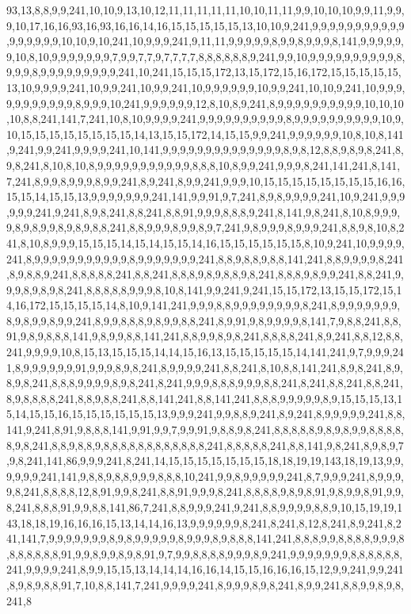 93,13,8,8,9,9,241,10,10,9,13,10,12,11,11,11,11,11,10,10,11,11,9,9,10,10,10,9,9,11,9,9,9,10,17,16,16,93,16,93,16,16,14,16,15,15,15,15,15,13,10,10,9,241,9,9,9,9,9,9,9,9,9,9,9,9,9,9,9,9,9,10,10,9,10,241,10,9,9,9,241,9,11,11,9,9,9,9,9,8,9,9,8,9,9,9,8,141,9,9,9,9,9,9,10,8,10,9,9,9,9,9,9,9,7,9,9,7,7,9,7,7,7,7,8,8,8,8,8,8,9,241,9,9,10,9,9,9,9,9,9,9,9,9,9,8,9,9,9,8,9,9,9,9,9,9,9,9,9,241,10,241,15,15,15,172,13,15,172,15,16,172,15,15,15,15,15,13,10,9,9,9,9,241,10,9,9,241,10,9,9,241,10,9,9,9,9,9,9,10,9,9,241,10,10,9,241,10,9,9,9,9,9,9,9,9,9,9,9,8,9,9,9,10,241,9,9,9,9,9,9,12,8,10,8,9,241,8,9,9,9,9,9,9,9,9,9,9,10,10,10,10,8,8,241,141,7,241,10,8,10,9,9,9,9,241,9,9,9,9,9,9,9,9,9,9,8,9,9,9,9,9,9,9,9,9,9,10,9,10,15,15,15,15,15,15,15,15,14,13,15,15,172,14,15,15,9,9,241,9,9,9,9,9,9,10,8,10,8,141,9,241,9,9,241,9,9,9,9,241,10,141,9,9,9,9,9,9,9,9,9,9,9,9,9,9,8,9,8,12,8,8,9,8,9,8,241,8,9,8,241,8,10,8,10,8,9,9,9,9,9,9,9,9,9,9,9,8,8,8,10,8,9,9,241,9,9,9,8,241,141,241,8,141,7,241,8,9,9,8,9,9,9,8,9,9,241,8,9,241,8,9,9,241,9,9,9,10,15,15,15,15,15,15,15,15,16,16,15,15,14,15,15,13,9,9,9,9,9,9,9,241,141,9,9,91,9,7,241,8,9,8,9,9,9,9,241,10,9,241,9,9,9,9,9,9,241,9,241,8,9,8,241,8,8,241,8,8,91,9,9,9,8,8,8,9,241,8,141,9,8,241,8,10,8,9,9,9,9,8,9,8,9,9,8,9,8,9,8,8,241,8,8,9,9,9,8,9,9,8,9,7,241,9,8,9,9,9,8,9,9,9,241,8,8,9,8,10,8,241,8,10,8,9,9,9,15,15,15,14,15,14,15,15,14,16,15,15,15,15,15,15,8,10,9,241,10,9,9,9,9,241,8,9,9,9,9,9,9,9,9,9,9,9,8,9,9,9,9,9,9,9,241,8,8,9,8,8,9,8,8,141,241,8,8,9,9,9,9,8,241,8,9,8,8,9,241,8,8,8,8,8,241,8,8,241,8,8,8,9,8,9,8,8,9,8,241,8,8,8,9,8,9,9,241,8,8,241,9,9,9,8,9,8,9,8,241,8,8,8,8,8,9,9,9,8,10,8,141,9,9,241,9,241,15,15,172,13,15,15,172,15,14,16,172,15,15,15,15,14,8,10,9,141,241,9,9,9,8,8,9,9,9,9,9,9,9,9,8,241,8,9,9,9,9,9,9,9,8,9,8,9,9,8,9,9,241,8,9,9,8,8,8,9,8,9,9,8,8,241,8,9,91,9,8,9,9,9,9,8,141,7,9,8,8,241,8,8,91,9,8,9,8,8,8,141,9,8,9,9,8,8,141,241,8,8,9,9,8,9,8,241,8,8,8,8,241,8,9,241,8,8,12,8,8,241,9,9,9,9,10,8,15,13,15,15,15,14,14,15,16,13,15,15,15,15,15,14,141,241,9,7,9,9,9,241,8,9,9,9,9,9,9,91,9,9,9,8,9,8,241,8,9,9,9,9,241,8,8,241,8,10,8,8,141,241,8,9,8,241,8,9,8,9,8,241,8,8,8,9,9,9,9,8,9,8,241,8,241,9,9,9,8,8,8,9,9,9,8,8,241,8,241,8,8,241,8,8,241,8,9,8,8,8,8,241,8,8,9,8,8,241,8,8,141,241,8,8,141,241,8,8,8,9,9,9,9,9,8,9,15,15,15,13,15,14,15,15,16,15,15,15,15,15,15,13,9,9,9,241,9,9,8,8,9,241,8,9,241,8,9,9,9,9,9,241,8,8,141,9,241,8,91,9,8,8,8,141,9,91,9,9,7,9,9,91,9,8,8,9,8,241,8,8,8,8,8,9,8,9,8,9,9,8,8,8,8,8,9,8,241,8,8,9,8,8,9,8,8,8,8,8,8,8,8,8,8,8,8,241,8,8,8,8,8,241,8,8,141,9,8,241,8,9,8,9,7,9,8,241,141,86,9,9,9,241,8,241,14,15,15,15,15,15,15,15,18,18,19,19,143,18,19,13,9,9,9,9,9,9,241,141,9,8,8,9,8,8,9,9,9,8,8,8,10,241,9,9,8,9,9,9,9,9,241,8,7,9,9,9,241,8,9,9,9,9,8,241,8,8,8,8,12,8,91,9,9,8,241,8,8,91,9,9,9,8,241,8,8,8,8,9,8,9,8,91,9,8,9,9,8,91,9,9,8,241,8,8,8,91,9,9,8,8,141,86,7,241,8,8,9,9,9,241,9,241,8,8,9,9,9,9,8,8,9,10,15,19,19,143,18,18,19,16,16,16,15,13,14,14,16,13,9,9,9,9,9,9,8,241,8,241,8,12,8,241,8,9,241,8,241,141,7,9,9,9,9,9,9,9,8,9,8,9,9,9,9,9,8,9,9,9,8,9,8,8,8,141,241,8,8,8,9,9,8,8,8,8,9,9,9,8,8,8,8,8,8,8,91,9,9,8,9,9,8,9,8,91,9,7,9,9,8,8,8,8,9,9,9,8,9,241,9,9,9,9,9,9,9,8,8,8,8,8,8,241,9,9,9,9,241,8,9,9,15,15,13,14,14,14,16,16,14,15,15,16,16,16,15,12,9,9,241,9,9,241,8,9,8,9,8,8,91,7,10,8,8,141,7,241,9,9,9,9,241,8,9,9,9,8,9,8,241,8,9,9,241,8,8,9,9,8,9,8,241,8